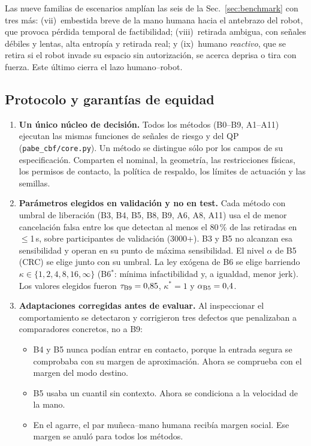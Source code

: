 Las nueve familias de escenarios amplían las seis de la Sec.~\ref{sec:benchmark} con tres más:
(vii)~embestida breve de la mano humana hacia el antebrazo del robot, que provoca pérdida temporal de
factibilidad; (viii)~retirada ambigua, con señales débiles y lentas, alta entropía y retirada real; y (ix)~humano
\emph{reactivo}, que se retira si el robot invade su espacio sin autorización, se acerca deprisa o tira
con fuerza. Este último cierra el lazo humano--robot.

\subsection{Protocolo y garantías de equidad}
\label{sec:g1:fair}
\begin{enumerate}[label=(\roman*)]
\item \textbf{Un único núcleo de decisión.} Todos los métodos (B0--B9, A1--A11) ejecutan las mismas
funciones de señales de riesgo y del QP (\texttt{pabe\_cbf/core.py}). Un método se distingue sólo por los
campos de su especificación. Comparten el nominal, la geometría, las restricciones físicas, los permisos de
contacto, la política de respaldo, los límites de actuación y las semillas.
\item \textbf{Parámetros elegidos en validación y no en test.} Cada método con umbral de liberación (B3,
B4, B5, B8, B9, A6, A8, A11) usa el de menor cancelación falsa entre los que detectan al menos el
80\,\% de las retiradas en $\le$1\,s, sobre participantes de validación (3000+). B3 y B5 no alcanzan
esa sensibilidad y operan en su punto de máxima sensibilidad. El nivel $\alpha$ de B5 (CRC) se elige junto con su umbral.
La ley exógena de B6 se elige barriendo $\kappa\in\{1,2,4,8,16,\infty\}$ (B6$^\ast$: mínima
infactibilidad y, a igualdad, menor jerk). Los valores elegidos fueron
$\tau_{\rm B9}=0{,}85$, $\kappa^\ast=1$ y $\alpha_{\rm B5}=0{,}4$.
\item \textbf{Adaptaciones corregidas antes de evaluar.} Al inspeccionar el comportamiento se detectaron
y corrigieron tres defectos que penalizaban a comparadores concretos, no a B9:
\begin{itemize}
\item B4 y B5 nunca podían entrar en contacto, porque la entrada segura se comprobaba con su margen de aproximación.
Ahora se comprueba con el margen del modo destino.
\item B5 usaba un cuantil sin contexto. Ahora se condiciona a la velocidad de la mano.
\item En el agarre, el par muñeca--mano humana recibía margen social. Ese margen se anuló para todos los métodos.

\end{itemize}
\end{enumerate}
